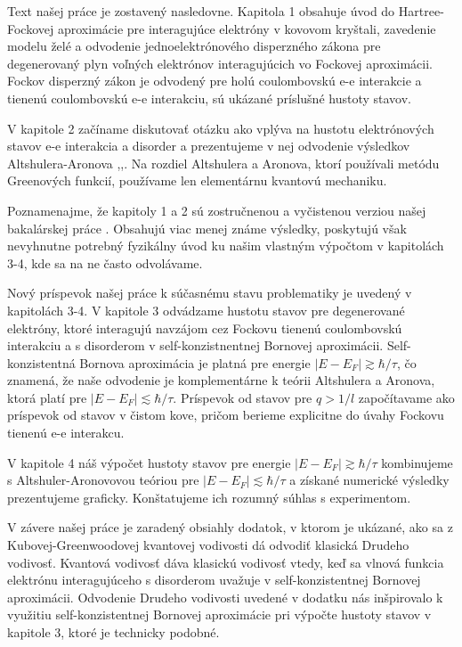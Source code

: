 Text našej práce je zostavený nasledovne. Kapitola 1 obsahuje úvod do Hartree-Fockovej aproximácie pre interagujúce
 elektróny v kovovom kryštali, zavedenie modelu želé a odvodenie jednoelektrónového disperzného zákona pre degenerovaný plyn voľných elektrónov interagujúcich vo Fockovej aproximácii. 
 Fockov disperzný zákon je odvodený pre holú coulombovskú e-e interakcie a tienenú coulombovskú e-e interakciu, sú ukázané príslušné hustoty stavov.
 
 V kapitole 2 začíname diskutovať otázku ako vplýva na hustotu elektrónových stavov e-e interakcia a disorder a prezentujeme v nej odvodenie výsledkov 
 Altshulera-Aronova \cite{Altshuler1},\cite{Altshuler3},\cite{Altshuler4}. 
 Na rozdiel Altshulera a Aronova, ktorí používali metódu Greenových funkcií, používame len elementárnu kvantovú mechaniku.
 
Poznamenajme, že kapitoly 1 a 2 sú zostručnenou a vyčistenou verziou našej bakalárskej práce \cite{}. Obsahujú viac menej známe výsledky, poskytujú však nevyhnutne potrebný fyzikálny úvod ku našim
vlastným výpočtom v kapitolách 3-4, kde sa na ne často odvolávame. 

Nový príspevok našej práce k súčasnému stavu problematiky je uvedený v kapitolách 3-4. V kapitole 3 odvádzame hustotu stavov pre degenerované elektróny, ktoré interagujú navzájom cez Fockovu tienenú coulombovskú interakciu
a s disorderom v self-konzistnentnej Bornovej aproximácii. Self-konzistentná Bornova aproximácia je platná pre energie $|E-E_F| \gtrsim \hbar/\tau $, čo znamená, že naše odvodenie je komplementárne k teórii Altshulera a Aronova, ktorá platí pre $|E-E_F| \lesssim \hbar/\tau $. Príspevok od stavov pre $q > 1/l$  započítavame
ako príspevok od stavov v čistom kove, pričom berieme explicitne do úvahy Fockovu tienenú e-e interakcu. 

V kapitole 4 náš výpočet hustoty stavov pre energie $|E-E_F|  \gtrsim \hbar/\tau$ kombinujeme s Altshuler-Aronovovou teóriou pre $|E-E_F|  \lesssim \hbar/\tau$ a získané
numerické výsledky prezentujeme graficky. Konštatujeme ich rozumný súhlas s experimentom. 

V závere našej práce je zaradený obsiahly dodatok, v ktorom je ukázané, ako sa z Kubovej-Greenwoodovej kvantovej vodivosti dá odvodiť klasická Drudeho vodivosť. 
Kvantová vodivosť dáva klasickú vodivosť vtedy, keď sa vlnová funkcia elektrónu interagujúceho s disorderom uvažuje v self-konzistentnej Bornovej aproximácii.
Odvodenie Drudeho vodivosti uvedené v dodatku  nás inšpirovalo k využitiu self-konzistentnej Bornovej aproximácie pri výpočte hustoty stavov v kapitole 3, ktoré je technicky podobné. 
